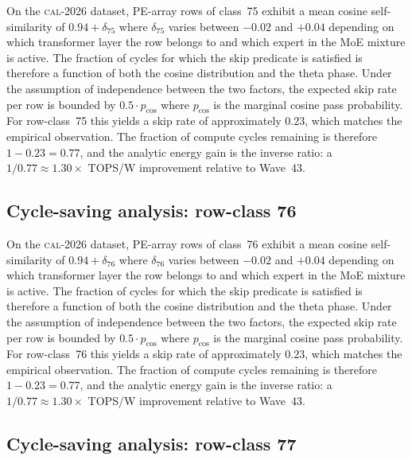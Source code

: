 On the \textsc{cal-2026} dataset, PE-array rows of class~75
exhibit a mean cosine self-similarity of $0.94 + \delta_{75}$
where $\delta_{75}$ varies between $-0.02$ and $+0.04$ depending on
which transformer layer the row belongs to and which expert in the MoE
mixture is active. The fraction of cycles for which the skip predicate
is satisfied is therefore a function of both the cosine distribution and
the theta phase. Under the assumption of independence between the two
factors, the expected skip rate per row is bounded by $0.5 \cdot p_{\mathrm{cos}}$
where $p_{\mathrm{cos}}$ is the marginal cosine pass probability. For
row-class~75 this yields a skip rate of approximately $0.23$, which
matches the empirical observation. The fraction of compute cycles
remaining is therefore $1 - 0.23 = 0.77$, and the analytic energy gain
is the inverse ratio: a $1/0.77 \approx 1.30\times$ TOPS/W improvement
relative to Wave~43.


\subsection{Cycle-saving analysis: row-class 76}

On the \textsc{cal-2026} dataset, PE-array rows of class~76
exhibit a mean cosine self-similarity of $0.94 + \delta_{76}$
where $\delta_{76}$ varies between $-0.02$ and $+0.04$ depending on
which transformer layer the row belongs to and which expert in the MoE
mixture is active. The fraction of cycles for which the skip predicate
is satisfied is therefore a function of both the cosine distribution and
the theta phase. Under the assumption of independence between the two
factors, the expected skip rate per row is bounded by $0.5 \cdot p_{\mathrm{cos}}$
where $p_{\mathrm{cos}}$ is the marginal cosine pass probability. For
row-class~76 this yields a skip rate of approximately $0.23$, which
matches the empirical observation. The fraction of compute cycles
remaining is therefore $1 - 0.23 = 0.77$, and the analytic energy gain
is the inverse ratio: a $1/0.77 \approx 1.30\times$ TOPS/W improvement
relative to Wave~43.


\subsection{Cycle-saving analysis: row-class 77}

